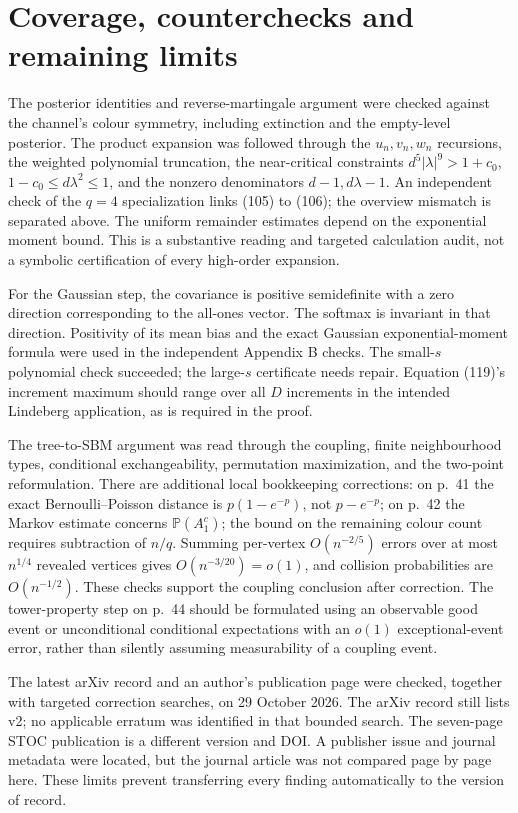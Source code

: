 \documentclass[10pt]{article}
\begin{document}
\section*{Coverage, counterchecks and remaining limits}
The posterior identities and reverse-martingale argument were checked against the channel’s colour symmetry, including extinction and the empty-level posterior. The product expansion was followed through the \(u_n,v_n,w_n\) recursions, the weighted polynomial truncation, the near-critical constraints \(d^5|\lambda|^9>1+c_0\), \(1-c_0\leq d\lambda^2\leq1\), and the nonzero denominators \(d-1,d\lambda-1\). An independent check of the \(q=4\) specialization links (105) to (106); the overview mismatch is separated above. The uniform remainder estimates depend on the exponential moment bound. This is a substantive reading and targeted calculation audit, not a symbolic certification of every high-order expansion.\par
For the Gaussian step, the covariance is positive semidefinite with a zero direction corresponding to the all-ones vector. The softmax is invariant in that direction. Positivity of its mean bias and the exact Gaussian exponential-moment formula were used in the independent Appendix B checks. The small-\(s\) polynomial check succeeded; the large-\(s\) certificate needs repair. Equation (119)’s increment maximum should range over all \(D\) increments in the intended Lindeberg application, as is required in the proof.\par
The tree-to-SBM argument was read through the coupling, finite neighbourhood types, conditional exchangeability, permutation maximization, and the two-point reformulation. There are additional local bookkeeping corrections: on p. 41 the exact Bernoulli–Poisson distance is \(p(1-e^{-p})\), not \(p-e^{-p}\); on p. 42 the Markov estimate concerns \(\mathbb P(A_1^c)\); the bound on the remaining colour count requires subtraction of \(n/q\). Summing per-vertex \(O(n^{-2/5})\) errors over at most \(n^{1/4}\) revealed vertices gives \(O(n^{-3/20})=o(1)\), and collision probabilities are \(O(n^{-1/2})\). These checks support the coupling conclusion after correction. The tower-property step on p. 44 should be formulated using an observable good event or unconditional conditional expectations with an \(o(1)\) exceptional-event error, rather than silently assuming measurability of a coupling event.\par
The latest arXiv record and an author’s publication page were checked, together with targeted correction searches, on 29 October 2026. The arXiv record still lists v2; no applicable erratum was identified in that bounded search. The seven-page STOC publication is a different version and DOI. A publisher issue and journal metadata were located, but the journal article was not compared page by page here. These limits prevent transferring every finding automatically to the version of record.\par
\end{document}
